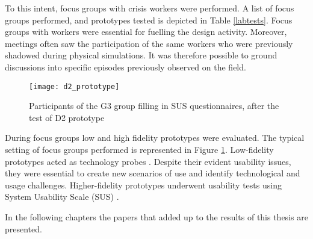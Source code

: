 To this intent, focus groups with crisis workers were performed. A list of focus groups performed, and prototypes tested is depicted in Table \ref{labtests}. Focus groups with workers were essential for fuelling the design activity. Moreover, meetings often saw the participation of the same workers who were previously shadowed during physical simulations. It was therefore possible to ground discussions into specific episodes previously observed on the field.

\begin{figure}
	[tbh] \centering 
	\texttt{[image: d2\_prototype]} \caption{Participants of the G3 group filling in SUS questionnaires, after the test of D2 prototype} \label{fig:focus-group} 
\end{figure}

During focus groups low and high fidelity prototypes were evaluated. The typical setting of focus groups performed is represented in Figure \ref{fig:focus-group}. Low-fidelity prototypes acted as technology probes \autocite{Hutchinson:2003il}. Despite their evident usability issues, they were essential to create new scenarios of use and identify technological and usage challenges. Higher-fidelity prototypes underwent usability tests \autocite{Dumas:2009th} using System Usability Scale (SUS) \autocite[page 189]{jordan1996usability}.

In the following chapters the papers that added up to the results of this thesis are presented.